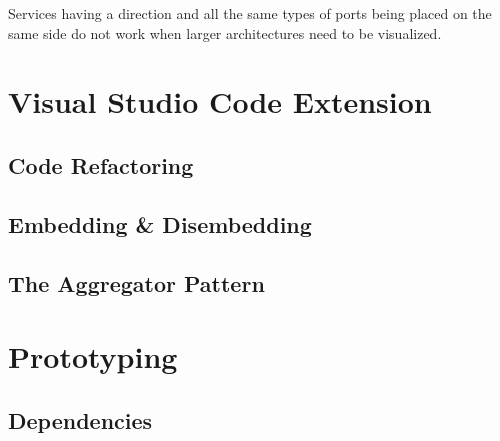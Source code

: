 Services having a direction and all the same types of ports being placed on the same side do not work when larger architectures need to be visualized.

\section{Visual Studio Code Extension}

\subsection{Code Refactoring}
\subsection{Embedding \& Disembedding}
\subsection{The Aggregator Pattern}

\section{Prototyping}
\subsection{Dependencies}
\clearpage